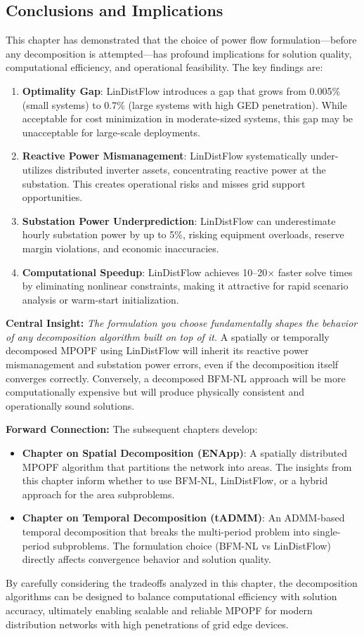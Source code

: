 \subsection{Conclusions and Implications}

This chapter has demonstrated that the choice of power flow formulation—before any decomposition is attempted—has profound implications for solution quality, computational efficiency, and operational feasibility. The key findings are:

\begin{enumerate}
    \item \textbf{Optimality Gap}: LinDistFlow introduces a gap that grows from 0.005\% (small systems) to 0.7\% (large systems with high GED penetration). While acceptable for cost minimization in moderate-sized systems, this gap may be unacceptable for large-scale deployments.
    
    \item \textbf{Reactive Power Mismanagement}: LinDistFlow systematically under-utilizes distributed inverter assets, concentrating reactive power at the substation. This creates operational risks and misses grid support opportunities.
    
    \item \textbf{Substation Power Underprediction}: LinDistFlow can underestimate hourly substation power by up to 5\%, risking equipment overloads, reserve margin violations, and economic inaccuracies.
    
    \item \textbf{Computational Speedup}: LinDistFlow achieves 10--20× faster solve times by eliminating nonlinear constraints, making it attractive for rapid scenario analysis or warm-start initialization.
\end{enumerate}

\textbf{Central Insight:} \textit{The formulation you choose fundamentally shapes the behavior of any decomposition algorithm built on top of it.} A spatially or temporally decomposed MPOPF using LinDistFlow will inherit its reactive power mismanagement and substation power errors, even if the decomposition itself converges correctly. Conversely, a decomposed BFM-NL approach will be more computationally expensive but will produce physically consistent and operationally sound solutions.

\textbf{Forward Connection:} The subsequent chapters develop:
\begin{itemize}
    \item \textbf{Chapter on Spatial Decomposition (ENApp)}: A spatially distributed MPOPF algorithm that partitions the network into areas. The insights from this chapter inform whether to use BFM-NL, LinDistFlow, or a hybrid approach for the area subproblems.
    
    \item \textbf{Chapter on Temporal Decomposition (tADMM)}: An ADMM-based temporal decomposition that breaks the multi-period problem into single-period subproblems. The formulation choice (BFM-NL vs LinDistFlow) directly affects convergence behavior and solution quality.
\end{itemize}

By carefully considering the tradeoffs analyzed in this chapter, the decomposition algorithms can be designed to balance computational efficiency with solution accuracy, ultimately enabling scalable and reliable MPOPF for modern distribution networks with high penetrations of grid edge devices.
